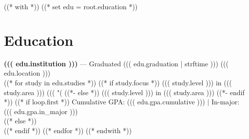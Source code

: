((* with *))
((* set edu = root.education *))
\section{Education}\relax
    {\large\textbf{((( edu.institution )))}} --- Graduated ((( edu.graduation | strftime ))) \hfill{\small ((( edu.location )))}\\
((* for study in edu.studies *))
        ((* if study.focus *))
    ((( study.level ))) in ((( study.area ))) ((( "(%
        ((*- else *))
    ((( study.level ))) in ((( study.area )))
        ((*- endif *))
        ((* if loop.first *))
 \hfill Cumulative GPA: ((( edu.gpa.cumulative ))) $|$ In-major: ((( edu.gpa.in_major )))\\
        ((* else *))
\\
        ((* endif *))
((* endfor *))
((* endwith *))
